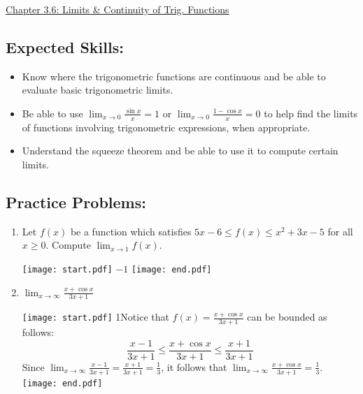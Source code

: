 \documentclass[12pt]{article}
\begin{document}
\begin{center}
\underline{\LARGE{Chapter 3.6: Limits \& Continuity of Trig. Functions}}
\end{center}

\subsection*{Expected Skills:}

\begin{itemize}

\item Know where the trigonometric functions are continuous and be able to evaluate basic trigonometric limits.

\item Be able to use $\lim_{x\rightarrow0}\frac{\sin{x}}{x}=1$ or $\lim_{x \rightarrow 0}\frac{1-\cos{x}}{x}=0$ to help find the limits of functions involving trigonometric expressions, when appropriate.

\item Understand the squeeze theorem and be able to use it to compute certain limits.

\end{itemize}

\subsection*{Practice Problems: }


\begin{enumerate}

\item Let $f(x)$ be a function which satisfies $\displaystyle 5x-6 \leq f(x) \leq x^2+3x-5$ for all $x \geq 0$.  Compute $\displaystyle \lim_{x \rightarrow 1}{f(x)}$.

\texttt{[image: start.pdf]}
{{$-1$}}
\texttt{[image: end.pdf]}


\item $\lim_{x\to\infty} \frac{x+\cos{x}}{3x+1}$

\texttt{[image: start.pdf]}
{{{1\linewidth}{Notice that $f(x)=\frac{x+\cos{x}}{3x+1}$ can be bounded as follows: $$\frac{x-1}{3x+1} \leq \frac{x+\cos{x}}{3x+1} \leq \frac{x+1}{3x+1}$$  Since $\lim_{x\to\infty} \frac{x-1}{3x+1}= \frac{x+1}{3x+1}=\frac{1}{3}$, it follows that $\lim_{x\to\infty}  \frac{x+\cos{x}}{3x+1}=\frac{1}{3}$.}}}
\texttt{[image: end.pdf]}


\end{enumerate}
\end{document}
